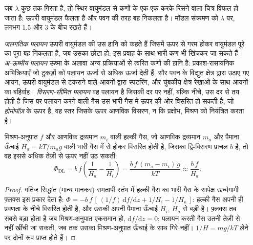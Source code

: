 
जब $\lambda$ कुछ तक गिरता है, तो स्थिर वायुमंडल से कणों के एक-एक करके रिसने वाला चित्र
विफल हो जाता है: ऊपरी वायुमंडल फैलता है और पवन की तरह बह निकलता है।
मॉडल संक्रमण को $\lambda$ पर, लगभग 1.5
और 3 के बीच रखते हैं।

\begin{definition}\label{def:b3:planetary-atmospheres:hydrodynamic}
\emph{जलगतिक पलायन} ऊपरी वायुमंडल की उस हानि को कहते हैं जिसमें
ऊपर से गरम होकर वायुमंडल पूरे का पूरा बह निकलता है, जब उसका  छोटा हो;
इस प्रवाह के साथ भारी कण भी खिंचकर जा सकते हैं।
\emph{अ-ऊष्मीय पलायन} ऊष्मा के अलावा अन्य प्रक्रियाओं से त्वरित कणों की हानि है:
प्रकाश-रासायनिक अभिक्रियाएँ जो टुकड़ों को पलायन ऊर्जा से अधिक ऊर्जा देती हैं,
सौर पवन के विद्युत क्षेत्र द्वारा उठाए गए आयन,
ऊपरी वायुमंडल से टकराने वाले आयनों द्वारा स्पटरिंग,
और चुंबकीय क्षेत्र रेखाओं के साथ आयनों का बहिर्वाह।
\emph{विसरण-सीमित पलायन} वह पलायन है
जिसकी दर  पर नहीं, बल्कि नीचे, उस दर से तय होती है जिस पर
पलायन करने वाली गैस उस भारी गैस में ऊपर की ओर विसरित हो सकती है,
जो \emph{होमोपॉज़} के ऊपर है, वह स्तर जिसके ऊपर
आणविक विसरण, न कि प्रक्षोभ, मिश्रण को नियंत्रित करता है।
\end{definition}

\begin{proposition}[विसरण सीमा]\label{prop:b3:planetary-atmospheres:diffusion}
मिश्रण-अनुपात $f$ और आणविक द्रव्यमान $m_i$ वाली हल्की गैस, जो
आणविक द्रव्यमान $m_a$ और पैमाना ऊँचाई $H_a =
kT/m_a g$ वाली भारी गैस में से होकर विसरित होती है, जिसका द्वि-विसरण प्राचल $b$ है,
तो वह इससे अधिक तेज़ी से ऊपर नहीं उठ सकती:
\[
\Phi_\mathrm{DL} = b\,f\left(\frac1{H_a} - \frac1{H_i}\right)
= \frac{b\,f\,(m_a - m_i)\,g}{kT} \approx \frac{b\,f}{H_a}.
\]
\end{proposition}

\begin{proof}
गतिज सिद्धांत (मान्य मानकर) समतापी स्तंभ में हल्की गैस का भारी गैस के सापेक्ष
ऊर्ध्वगामी फ़्लक्स इस प्रकार देता है: $\Phi = -b\,f\,
[\,(1/f)\,\mathrm df/\mathrm dz + 1/H_i - 1/H_a\,]$: हल्की गैस अपनी ही प्रवणता के नीचे विसरित होती है,
और उसकी अपनी पैमाना ऊँचाई $H_i$,
$H_a$ से बड़ी है। फ़्लक्स तब सबसे बड़ा होता है जब मिश्रण-अनुपात एकसमान हो, $\mathrm
df/\mathrm dz = 0$; पलायन करती गैस उतनी तेज़ी से नहीं खींची जा सकती,
जब तक उसका मिश्रण-अनुपात ऊँचाई के साथ गिरे नहीं। $1/H = mg/kT$ लेने पर दोनों रूप
प्राप्त होते हैं।
\end{proof}

